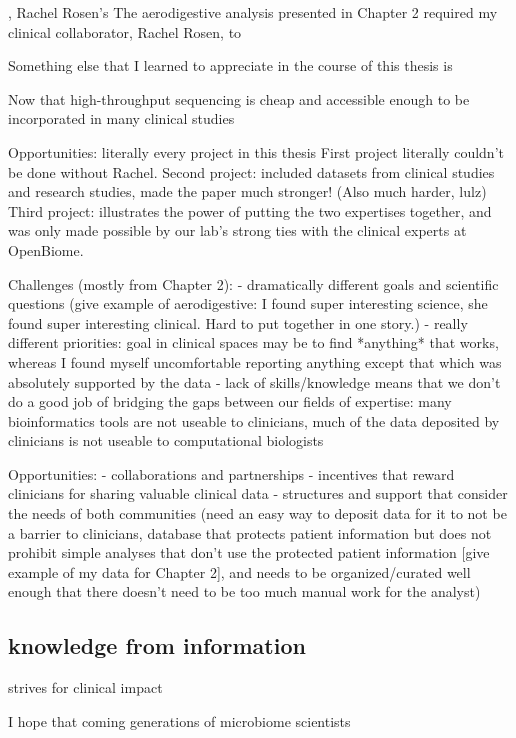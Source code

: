 , Rachel Rosen's
The aerodigestive analysis presented in Chapter 2 required my clinical collaborator, Rachel Rosen, to

Something else that I learned to appreciate in the course of this thesis is

Now that high-throughput sequencing is cheap and accessible enough to be incorporated in many clinical studies


Opportunities: literally every project in this thesis
First project literally couldn't be done without Rachel.
Second project: included datasets from clinical studies and research studies, made the paper much stronger! (Also much harder, lulz)
Third project: illustrates the power of putting the two expertises together, and was only made possible by our lab's strong ties with the clinical experts at OpenBiome.

Challenges (mostly from Chapter 2):
- dramatically different goals and scientific questions (give example of aerodigestive: I found super interesting science, she found super interesting clinical. Hard to put together in one story.)
- really different priorities: goal in clinical spaces may be to find *anything* that works, whereas I found myself uncomfortable reporting anything except that which was absolutely supported by the data
- lack of skills/knowledge means that we don't do a good job of bridging the gaps between our fields of expertise: many bioinformatics tools are not useable to clinicians, much of the data deposited by clinicians is not useable to computational biologists

Opportunities:
- collaborations and partnerships
- incentives that reward clinicians for sharing valuable clinical data
- structures and support that consider the needs of both communities (need an easy way to deposit data for it to not be a barrier to clinicians, database that protects patient information but does not prohibit simple analyses that don't use the protected patient information [give example of my data for Chapter 2], and needs to be organized/curated well enough that there doesn't need to be too much manual work for the analyst)

\subsection{knowledge from information}

strives for clinical impact

I hope that coming generations of microbiome scientists

